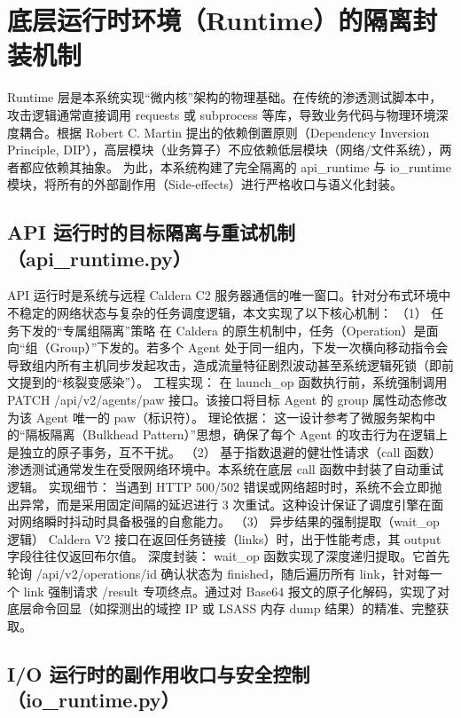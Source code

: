 \documentclass[twoside,openright]{xduugthesis}
\begin{document}
\section{底层运行时环境（Runtime）的隔离封装机制}
Runtime 层是本系统实现“微内核”架构的物理基础。在传统的渗透测试脚本中，攻击逻辑通常直接调用 requests 或 subprocess 等库，导致业务代码与物理环境深度耦合。根据 Robert C. Martin 提出的依赖倒置原则（Dependency Inversion Principle, DIP），高层模块（业务算子）不应依赖低层模块（网络/文件系统），两者都应依赖其抽象。
为此，本系统构建了完全隔离的 api_runtime 与 io_runtime 模块，将所有的外部副作用（Side-effects）进行严格收口与语义化封装。

\subsection{ API 运行时的目标隔离与重试机制（api_runtime.py）}
API 运行时是系统与远程 Caldera C2 服务器通信的唯一窗口。针对分布式环境中不稳定的网络状态与复杂的任务调度逻辑，本文实现了以下核心机制：
（1） 任务下发的“专属组隔离”策略 在 Caldera 的原生机制中，任务（Operation）是面向“组（Group）”下发的。若多个 Agent 处于同一组内，下发一次横向移动指令会导致组内所有主机同步发起攻击，造成流量特征剧烈波动甚至系统逻辑死锁（即前文提到的“核裂变感染”）。
工程实现： 在 launch_op 函数执行前，系统强制调用 PATCH /api/v2/agents/{paw} 接口。该接口将目标 Agent 的 group 属性动态修改为该 Agent 唯一的 paw（标识符）。
理论依据： 这一设计参考了微服务架构中的“隔板隔离（Bulkhead Pattern）”思想，确保了每个 Agent 的攻击行为在逻辑上是独立的原子事务，互不干扰。
（2） 基于指数退避的健壮性请求（call 函数） 渗透测试通常发生在受限网络环境中。本系统在底层 call 函数中封装了自动重试逻辑。
实现细节： 当遇到 HTTP 500/502 错误或网络超时时，系统不会立即抛出异常，而是采用固定间隔的延迟进行 3 次重试。这种设计保证了调度引擎在面对网络瞬时抖动时具备极强的自愈能力。
（3） 异步结果的强制提取（wait_op 逻辑） Caldera V2 接口在返回任务链接（links）时，出于性能考虑，其 output 字段往往仅返回布尔值。
深度封装： wait_op 函数实现了深度递归提取。它首先轮询 /api/v2/operations/{id} 确认状态为 finished，随后遍历所有 link，针对每一个 link 强制请求 /result 专项终点。通过对 Base64 报文的原子化解码，实现了对底层命令回显（如探测出的域控 IP 或 LSASS 内存 dump 结果）的精准、完整获取。

\subsection{I/O 运行时的副作用收口与安全控制（io_runtime.py）}
\end{document}
